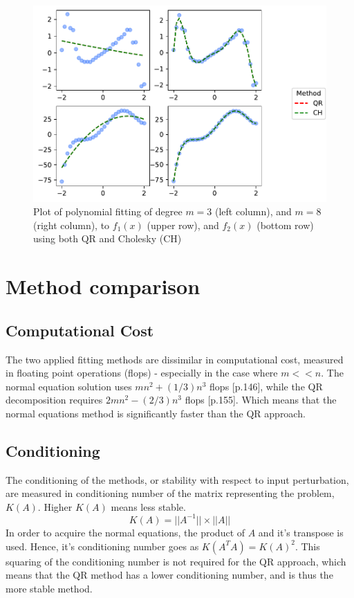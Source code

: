 \documentclass[%
oneside,                 %
final,                   %
10pt]{article}
\begin{document}
\begin{figure}[!htb]
        \centering 
         \includegraphics[scale=0.8]{Figures/methods.pdf} 
        \caption{Plot of polynomial fitting of degree $m=3$ (left column), and $m=8$ (right column), to $f_1(x)$ (upper row), and $f_2(x)$ (bottom row) using both QR and Cholesky (CH)}
        \label{fig:methods}   
\end{figure}  
\section{Method comparison}
\subsection{Computational Cost}
The two applied fitting methods are dissimilar in computational cost, measured in floating point operations (flops) - especially in the case where $m<<n$. The normal equation solution uses $mn^2
+ (1/3)n^3$ flops \citep{Ascher}[p.146], while the QR decomposition requires $2mn^2−(2/3)n^3$ flops  \citep{Ascher}[p.155]. Which means that the normal equations method is significantly faster than the QR approach.

\subsection{Conditioning}
The conditioning of the methods, or stability with respect to input perturbation, are measured in conditioning number of the matrix representing the problem, $K(A)$. Higher $K(A)$ means less stable. 
\begin{equation}
K(A)=||A^{-1}|| \times ||A||
\end{equation}
In order to acquire the normal equations, the product of $A$ and it's transpose is used. Hence, it's conditioning number goes as $K(A^TA)=K(A)^2$. This squaring of the conditioning number is not required for the QR approach, which means that the QR method has a lower conditioning number, and is thus the more stable method.
\end{document}
